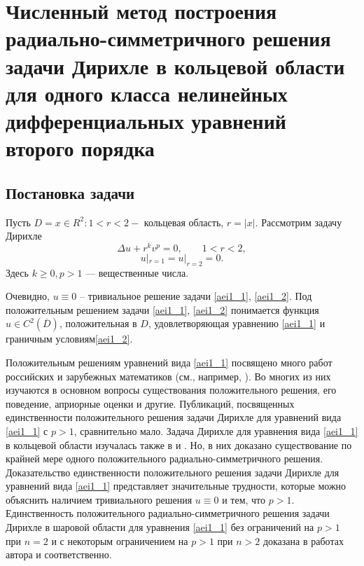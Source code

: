 


\chapter{ Численный метод построения  радиально-симметричного
 решения задачи Дирихле  в кольцевой области для  одного класса нелинейных
  дифференциальных уравнений  второго порядка}
















\section{Постановка задачи}

           Пусть $ D={x\in R^2: 1<r<2}-$  кольцевая область,
$ r=|x| $.    Рассмотрим задачу Дирихле
\begin{equation}\label{aei1_1}
\Delta u+r^kv^p=0, \qquad 1<r<2,
\end{equation}
\begin{equation}\label{aei1_2}
u|_{r=1}=u|_{r=2}=0.
\end{equation}
Здесь $ k \geq 0, p>1$ --- вещественные числа.

Очевидно, $ u \equiv 0$ -- тривиальное решение задачи \eqref{aei1_1}, \eqref{aei1_2}. Под
положительным решением задачи \eqref{aei1_1}, \eqref{aei1_2} понимается функция $ u \in
C^2(\overline {D})$, положительная в $D$, удовлетворяющая
уравнению \eqref{aei1_1} и граничным условиям\eqref{aei1_2}.

Положительным решениям уравнений вида \eqref{aei1_1} посвящено много
работ российских и зарубежных математиков
(см., например, \cite{aeiL_1, aeiL_2, aeiL_3, aeiL_4, aeiL_5, aeiL_6, aeiL_7, aeiL_8, aeiL_9, aeiL_10, aeiL_11, aeiL_12}). 
Во многих из них изучаются в основном
вопросы существования положительного решения, его поведение,
априорные оценки и другие. Публикаций, посвященных
единственности положительного решения задачи Дирихле
для уравнений вида \eqref{aei1_1} с $ p>1$, сравнительно мало.
Задача Дирихле для уравнения вида \eqref{aei1_1} в кольцевой области
изучалась также в \cite{aeiL_1} и \cite{aeiL_11}. Но, в них доказано существование
по крайней мере одного положительного радиально-симметричного
решения. Доказательство единственности положительного решения
 задачи Дирихле для уравнений вида \eqref{aei1_1} представляет
значительные трудности, которые можно объяснить наличием
тривиального решения $ u \equiv 0 $  и тем, что $ p>1 $.
Единственность положительного радиально-симметричного решения
задачи Дирихле в шаровой области для  уравнения \eqref{aei1_1}  без
ограничений на $ p>1 $ при $ n=2 $  и с некоторым
ограничением на $ p>1 $  при $ n>2 $  доказана в работах
автора \cite{aeiL_12} и  \cite{aeiL_13} соответственно.


